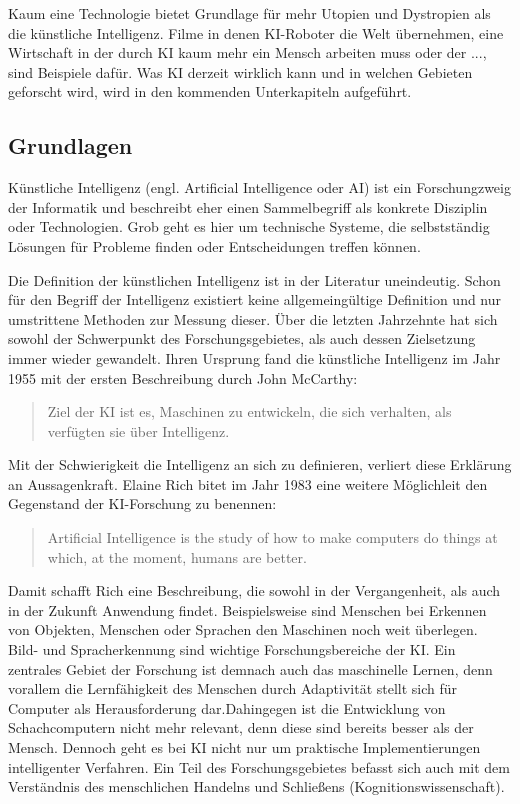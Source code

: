 \documentclass[a4paper,12pt, german]{report}
\begin{document}
Kaum eine Technologie bietet Grundlage für mehr Utopien und Dystropien als die künstliche Intelligenz. Filme in denen KI-Roboter die Welt übernehmen, eine Wirtschaft in der durch KI kaum mehr ein Mensch arbeiten muss oder der ..., sind Beispiele dafür. Was KI derzeit wirklich kann und in welchen Gebieten geforscht wird, wird in den kommenden Unterkapiteln aufgeführt.

\subsection{Grundlagen}

Künstliche Intelligenz (engl. Artificial Intelligence oder AI) ist ein Forschungzweig der Informatik und beschreibt eher einen Sammelbegriff als konkrete Disziplin oder Technologien. Grob geht es hier um technische Systeme, die selbstständig Lösungen für Probleme finden oder Entscheidungen treffen können. \cite{01} %

Die Definition der künstlichen Intelligenz ist in der Literatur uneindeutig. Schon für den Begriff der Intelligenz existiert keine allgemeingültige Definition und nur umstrittene Methoden zur Messung dieser. Über die letzten Jahrzehnte hat sich sowohl der Schwerpunkt des Forschungsgebietes, als auch dessen Zielsetzung immer wieder gewandelt. Ihren Ursprung fand die künstliche Intelligenz im Jahr 1955 mit der ersten Beschreibung durch John McCarthy:
\begin{quote}
  Ziel der KI ist es, Maschinen zu entwickeln, die sich verhalten, als verfügten sie über Intelligenz.
\end{quote}
 Mit der Schwierigkeit die Intelligenz an sich zu definieren, verliert diese Erklärung an Aussagenkraft. Elaine Rich bitet im Jahr 1983 eine weitere Möglichleit den Gegenstand der KI-Forschung zu benennen: 
 \begin{quote}
  Artificial Intelligence is the study of how to make computers do things at which, at the moment, humans are better.
 \end{quote} 
 Damit schafft Rich eine Beschreibung, die sowohl in der Vergangenheit, als auch in der Zukunft Anwendung findet. Beispielsweise sind Menschen bei Erkennen von Objekten, Menschen oder Sprachen den Maschinen noch weit überlegen. Bild- und Spracherkennung sind wichtige Forschungsbereiche der KI. Ein zentrales Gebiet der Forschung ist demnach auch das maschinelle Lernen, denn vorallem die Lernfähigkeit des Menschen durch Adaptivität stellt sich für Computer als Herausforderung dar.Dahingegen ist die Entwicklung von Schachcomputern nicht mehr relevant, denn diese sind bereits besser als der Mensch. Dennoch geht es bei KI nicht nur um praktische Implementierungen intelligenter Verfahren. Ein Teil des Forschungsgebietes befasst sich auch mit dem Verständnis des menschlichen Handelns und Schließens (Kognitionswissenschaft).
\end{document}
